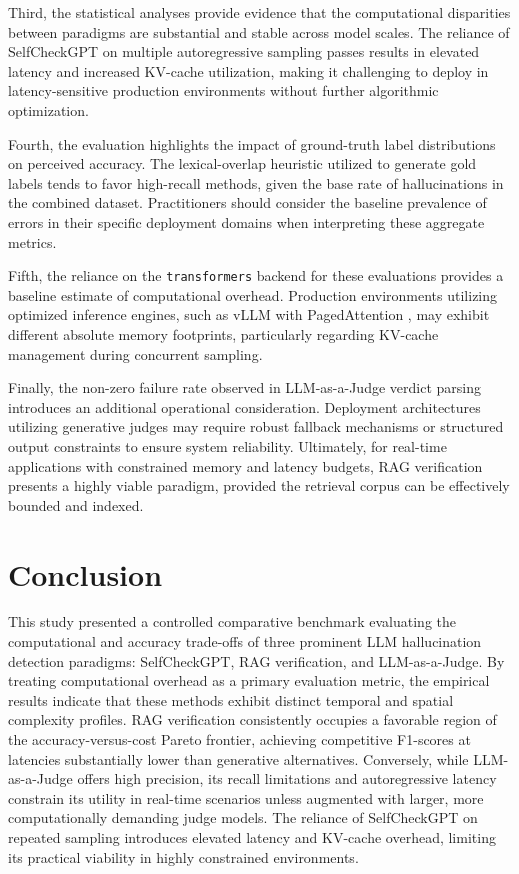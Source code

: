 \documentclass[conference]{IEEEtran}
\begin{document}
Third, the statistical analyses provide evidence that the computational disparities between paradigms are substantial and stable across model scales. The reliance of SelfCheckGPT on multiple autoregressive sampling passes results in elevated latency and increased KV-cache utilization, making it challenging to deploy in latency-sensitive production environments without further algorithmic optimization.

Fourth, the evaluation highlights the impact of ground-truth label distributions on perceived accuracy. The lexical-overlap heuristic utilized to generate gold labels tends to favor high-recall methods, given the base rate of hallucinations in the combined dataset. Practitioners should consider the baseline prevalence of errors in their specific deployment domains when interpreting these aggregate metrics.

Fifth, the reliance on the \texttt{transformers} backend for these evaluations provides a baseline estimate of computational overhead. Production environments utilizing optimized inference engines, such as vLLM with PagedAttention \cite{kwon2023efficient}, may exhibit different absolute memory footprints, particularly regarding KV-cache management during concurrent sampling.

Finally, the non-zero failure rate observed in LLM-as-a-Judge verdict parsing introduces an additional operational consideration. Deployment architectures utilizing generative judges may require robust fallback mechanisms or structured output constraints to ensure system reliability. Ultimately, for real-time applications with constrained memory and latency budgets, RAG verification presents a highly viable paradigm, provided the retrieval corpus can be effectively bounded and indexed.

\FloatBarrier
\section{Conclusion}

This study presented a controlled comparative benchmark evaluating the computational and accuracy trade-offs of three prominent LLM hallucination detection paradigms: SelfCheckGPT, RAG verification, and LLM-as-a-Judge. By treating computational overhead as a primary evaluation metric, the empirical results indicate that these methods exhibit distinct temporal and spatial complexity profiles. RAG verification consistently occupies a favorable region of the accuracy-versus-cost Pareto frontier, achieving competitive F1-scores at latencies substantially lower than generative alternatives. Conversely, while LLM-as-a-Judge offers high precision, its recall limitations and autoregressive latency constrain its utility in real-time scenarios unless augmented with larger, more computationally demanding judge models. The reliance of SelfCheckGPT on repeated sampling introduces elevated latency and KV-cache overhead, limiting its practical viability in highly constrained environments.
\end{document}

